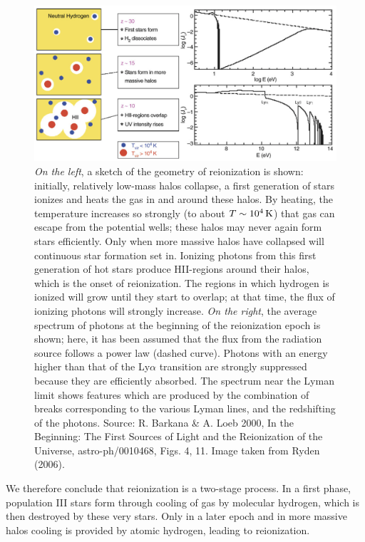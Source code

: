 \documentclass[a4paper,11pt]{article}
\begin{document}
\begin{figure}[t]
    \includegraphics[width=16cm]{figures/reionization.png}
    \centering
    \caption{\footnotesize{\textit{On the left}, a sketch of the geometry of reionization is shown: initially, relatively low-mass halos collapse, a first generation of stars ionizes and heats the gas in and around these halos. By heating, the temperature increases so strongly (to about $T\sim10^4\,{\rm K}$) that gas can escape from the potential wells; these halos may never again form stars efficiently. Only when more massive halos have collapsed will continuous star formation set in. Ionizing photons from this first generation of hot stars produce HII-regions around their halos, which is the onset of reionization. The regions in which hydrogen is ionized will grow until they start to overlap; at that time, the flux of ionizing photons will strongly increase. \textit{On the right}, the average spectrum of photons at the beginning of the reionization epoch is shown; here, it has been assumed that the flux from the radiation source follows a power law (dashed curve). Photons with an energy higher than that of the Ly$\alpha$ transition are strongly suppressed because they are efficiently absorbed. The spectrum near the Lyman limit shows features which are produced by the combination of breaks corresponding to the various Lyman lines, and the redshifting of the photons. Source: R. Barkana \& A. Loeb 2000, In the Beginning: The First Sources of Light and the Reionization of the Universe, astro-ph/0010468, Figs. 4, 11. Image taken from Ryden (2006).}}
    \label{fig:reionization}
\end{figure}

{\noindent}We therefore conclude that reionization is a two-stage process. In a first phase, population III stars form through cooling of gas by molecular hydrogen, which is then destroyed by these very stars. Only in a later epoch and in more massive halos cooling is provided by atomic hydrogen, leading to reionization.
\end{document}

